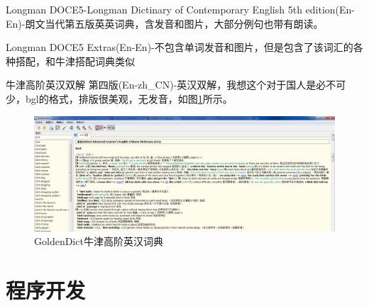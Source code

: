 \documentclass[paper=a4,fontsize=11pt]{article}
\begin{document}
	Longman DOCE5-Longman Dictinary of Contemporary English 5th edition(En-En)-朗文当代第五版英英词典，含发音和图片，大部分例句也带有朗读。  
	
	Longman DOCE5 Extras(En-En)-不包含单词发音和图片，但是包含了该词汇的各种搭配，和牛津搭配词典类似
	
	牛津高阶英汉双解 第四版(En-zh\_CN)-英汉双解，我想这个对于国人是必不可少，bgl的格式，排版很美观，无发音，如图\ref{GoldenDictOxford}所示。   
	
	\begin{figure}[htbp]
		\centering
		\includegraphics[scale=0.35]{GoldenDictOxford.jpg}
		\caption{GoldenDict牛津高阶英汉词典}
		\label{GoldenDictOxford}
	\end{figure}
	
	\clearpage
		
	\part{程序开发}	
	
	\clearpage
	
\end{document}
